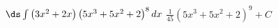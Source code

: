 {$\ds \int \left(3 x^2+2 x\right) \left(5 x^3+5 x^2+2\right)^8 dx $}
{$\frac{1}{45}(5x^3+5x^2+2)^9+C$}